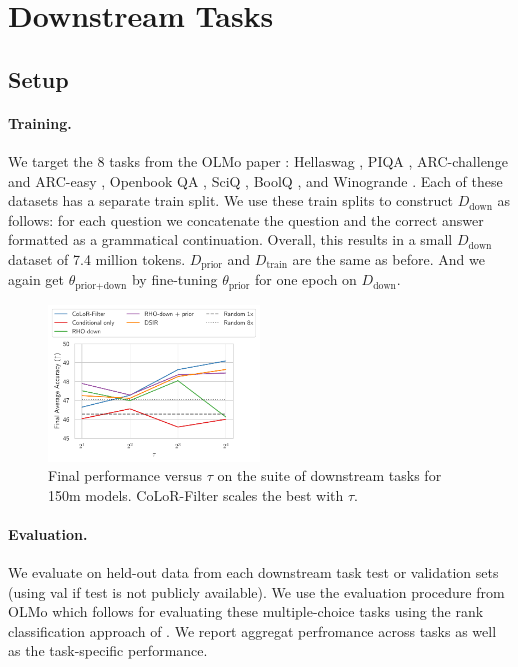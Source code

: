 \documentclass{article}
\newcommand{\Dprior}{D_{\text{prior}}}
\newcommand{\Ddown}{D_{\text{down}}}
\newcommand{\Dtrain}{D_{\text{train}}}
\newcommand{\thetaprior}{\theta_{\text{prior}}}
\newcommand{\thetapriordown}{\theta_{\text{prior}+ \text{down}}}
\begin{document}
\section{Downstream Tasks}\label{sec:down}



\subsection{Setup}

\paragraph{Training.} We target the 8 tasks from the OLMo paper \citep{groeneveld2024olmo}: Hellaswag \citep{zellers2019hellaswag}, PIQA \citep{bisk2020piqa}, ARC-challenge and ARC-easy \citep{clark2018think}, Openbook QA \citep{mihaylov2018can}, SciQ \citep{welbl2017crowdsourcing}, BoolQ \citep{clark2019boolq}, and Winogrande \citep{sakaguchi2021winogrande}. Each of these datasets has a separate train split. We use these train splits to construct $ \Ddown$ as follows: for each question we concatenate the question and the correct answer formatted as a grammatical continuation. Overall, this results in a small $ \Ddown$ dataset of 7.4 million tokens. $ \Dprior$ and $ \Dtrain$ are the same as before. And we again get $ \thetapriordown$ by fine-tuning $ \thetaprior $ for one epoch on $ \Ddown$.

\begin{figure}
    \centering
    \vspace{-1.2cm}
    \includegraphics[width=0.5\textwidth]{images/down_tau.pdf}
    \vspace{-0.7cm}
    \caption{Final performance versus $ \tau$ on the suite of downstream tasks for 150m models. CoLoR-Filter scales the best with $ \tau$.}
    \label{fig:down_tau}
\end{figure}

\paragraph{Evaluation.} We evaluate on held-out data from each downstream task test or validation sets (using val if test is not publicly available). We use the evaluation procedure from OLMo \citep{groeneveld2024olmo} which follows \citep{eval-harness} for evaluating these multiple-choice tasks using the rank classification approach of \citet{brown2020language}. We report aggregat perfromance across tasks as well as the task-specific performance.
\end{document}
